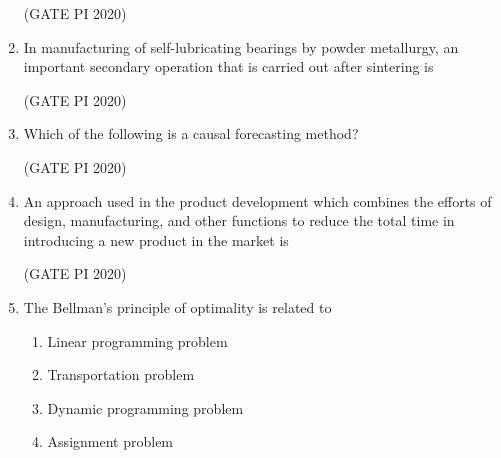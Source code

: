 \documentclass[journal,12pt,onecolumn]{IEEEtran}
\theoremstyle{remark}
\begin{document}
\begin{enumerate}
\hfill (GATE PI 2020)

\item In manufacturing of self-lubricating bearings by powder metallurgy, an important secondary operation that is carried out after sintering is
\begin{enumerate}
\end{enumerate}

\hfill (GATE PI 2020)

\item Which of the following is a causal forecasting method?
\begin{enumerate}
\end{enumerate}

\hfill (GATE PI 2020)

\item An approach used in the product development which combines the efforts of design, manufacturing, and other functions to reduce the total time in introducing a new product in the market is
\begin{enumerate}
\end{enumerate}

\hfill (GATE PI 2020)

\item The Bellman's principle of optimality is related to
\begin{enumerate}
    \item Linear programming problem
    \item Transportation problem
    \item Dynamic programming problem
    \item Assignment problem
\end{enumerate}


\end{enumerate}
\end{document}
